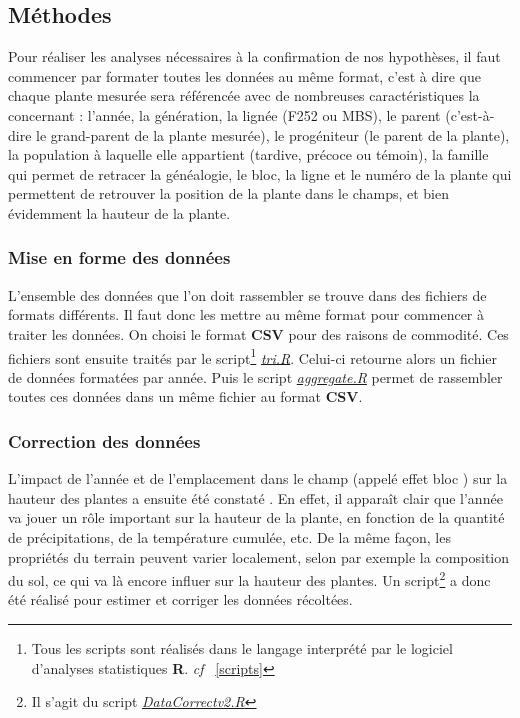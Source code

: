 \documentclass[12pt,a4paper]{article}
\begin{document}
			 		\subsection{Méthodes}
			 			
			 			Pour réaliser les analyses nécessaires à la confirmation de nos hypothèses, il faut commencer par formater toutes les données au même format, c'est à dire que chaque plante mesurée sera référencée avec de nombreuses caractéristiques la concernant : l'année, la génération, la lignée (F252 ou MBS), le parent (c'est-à-dire le \og grand-parent \fg de la plante mesurée), le progéniteur (le parent de la plante), la population à laquelle elle appartient (tardive, précoce ou témoin), la famille qui permet de retracer la généalogie, le bloc, la ligne et le numéro de la plante qui permettent de retrouver la position de la plante dans le champs, et bien évidemment la hauteur de la plante.
			 			
			 			\subsubsection{Mise en forme des données}
			 				
			 				L'ensemble des données que l'on doit rassembler se trouve dans des fichiers de formats différents. Il faut donc les mettre au même format pour commencer à traiter les données. On choisi le format \textbf{CSV} pour des raisons de commodité. Ces fichiers sont ensuite traités par le script\footnote{Tous les scripts sont réalisés dans le langage interprété par le logiciel d'analyses statistiques \textbf{R}. \textit{cf} ~\ref{scripts}} \textit{\ul{tri.R}}. Celui-ci retourne alors un fichier de données formatées par année. Puis le script \textit{\ul{aggregate.R}} permet de rassembler toutes ces données dans un même fichier au format \textbf{CSV}.
			 			
			 			\subsubsection{Correction des données}
			 				
			 				L'impact de l'année et de l'emplacement dans le champ (appelé \og effet bloc \fg) sur la hauteur des plantes a ensuite été constaté . En effet, il apparaît clair que l'année va jouer un rôle important sur la hauteur de la plante, en fonction de la quantité de précipitations, de la température cumulée, etc. De la même façon, les propriétés du terrain peuvent varier localement, selon par exemple la composition du sol, ce qui va là encore influer sur la hauteur des plantes. Un script\footnote{Il s'agit du script \textit{\ul{DataCorrectv2.R}}} a donc été réalisé pour estimer et corriger les données récoltées.
			 				
\end{document}
